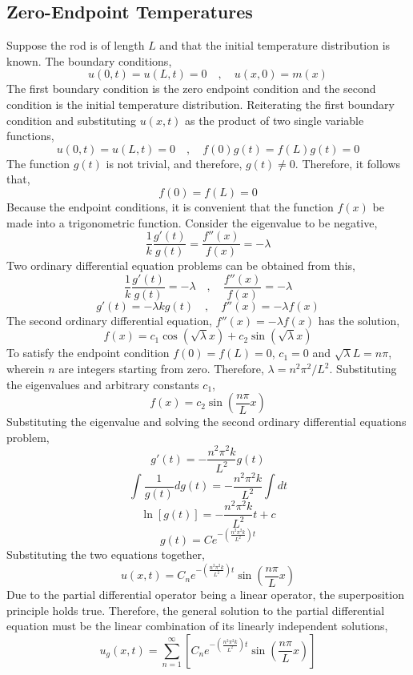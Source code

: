 \documentclass[a4paper, 12pt]{report}
\def\la{\lambda}
\def\f{\frac}
\def\l{\left}
\def\r{\right}
\def\dst{\displaystyle}
\begin{document}
\begin{center}
\subsection{Zero-Endpoint Temperatures}
Suppose the rod is of length $L$ and that the initial temperature distribution is known. The boundary conditions,
$$u(0,t) = u(L,t) = 0\quad,\quad u(x,0) = m(x)$$
The first boundary condition is the zero endpoint condition and the second condition is the initial temperature distribution. Reiterating the first boundary condition and substituting $u(x,t)$ as the product of two single variable functions,
$$u(0,t) = u(L,t) = 0\quad,\quad f(0)g(t) = f(L)g(t) = 0$$
The function $g(t)$ is not trivial, and therefore, $g(t) \neq 0$. Therefore, it follows that,
$$f(0) = f(L) = 0$$
Because the endpoint conditions, it is convenient that the function $f(x)$ be made into a trigonometric function. Consider the eigenvalue to be negative,
$$\f{1}{k}\f{g'(t)}{g(t)} = \f{f''(x)}{f(x)} = -\lambda$$
Two ordinary differential equation problems can be obtained from this,
$$\f{1}{k}\f{g'(t)}{g(t)} = -\lambda \quad,\quad \f{f''(x)}{f(x)} = -\lambda$$
$$g'(t) = -\lambda kg(t) \quad,\quad f''(x) = -\lambda f(x)$$
The second ordinary differential equation, $\dst{f''(x) = -\lambda f(x)}$ has the solution, 
$$f(x) = c_1\cos\l(\sqrt{\la}x\r) + c_2\sin\l(\sqrt{\la}x\r)$$
To satisfy the endpoint condition $\dst{f(0) = f(L) = 0}$, $c_1 = 0$ and $\sqrt{\la}L = n\pi$, wherein $n$ are integers starting from zero. Therefore, $\la = n^2\pi^2/L^2$. Substituting the eigenvalues and arbitrary constants $c_1$,
$$f(x) = c_2\sin\l(\f{n\pi}{L} x\r)$$
Substituting the eigenvalue and solving the second ordinary differential equations problem,
$$g'(t) = -\f{n^2\pi^2k}{L^2}g(t)$$
$$\int\f{1}{g(t)}dg(t) = -\f{n^2\pi^2k}{L^2}\int dt$$
$$\ln[g(t)] = -\f{n^2\pi^2k}{L^2}t + c$$
$$g(t) = Ce^{\dst{-\l(\f{n^2\pi^2k}{L^2}\r)t}}$$
Substituting the two equations together,
$$u(x,t) = C_ne^{\dst{-\l(\f{n^2\pi^2k}{L^2}\r)t}}\sin\l(\f{n\pi}{L} x\r)$$
Due to the partial differential operator being a linear operator, the superposition principle holds true. Therefore, the general solution to the partial differential equation must be the linear combination of its linearly independent solutions,
$$u_g(x,t) = \sum^{\infty}_{n=1}\l[C_ne^{\dst{-\l(\f{n^2\pi^2k}{L^2}\r)t}}\sin\l(\f{n\pi}{L} x\r)\r]$$

\end{center}
\end{document}

